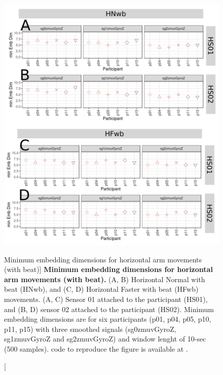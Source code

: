 \begin{figure}
\centering
\includegraphics[width=1.0\textwidth]{cao_Hwb_w10}
	\caption
	[Minimum embedding dimensions for horizontal arm movements 
	(with beat)]{
	{\bf Minimum embedding dimensions for horizontal arm movements 
	(with beat).} 
		(A, B) Horizontal Normal with beat (HNwb), and
		(C, D) Horizontal Faster with beat (HFwb) movements.
		(A, C) Sensor 01 attached to the participant (HS01), and
		(B, D) sensor 02 attached to the participant (HS02).
		Minimum embedding dimensions are for six participants 
		(p01, p04, p05, p10, p11, p15) with three smoothed signals 
		(sg0zmuvGyroZ, sg1zmuvGyroZ and sg2zmuvGyroZ)
		and window lenght of 10-sec (500 samples).
		\R code to reproduce the figure is available at 
		.
        }
    \label{fig:a:caoHwb}
\end{figure}


